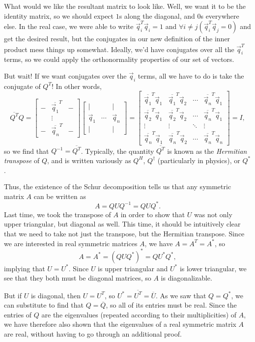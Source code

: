 \documentclass[letterpaper]{article}
\theoremstyle{remark}
\newcommand{\mat}[1]{\ensuremath{\begin{bmatrix}#1\end{bmatrix}}}
\begin{document}
What would we like the resultant matrix to look like. Well, we want it to be the identity matrix, so we should expect $1$s along the diagonal, and $0$s everywhere else. In the real case, we were able to write $\vec{q}_i^T\vec{q}_i = 1$ and $\forall i \ne j(\vec{q}_i^T\vec{q}_j = 0)$ and get the desired result, but the conjugates in our new definition of the inner product mess things up somewhat. Ideally, we'd have conjugates over all the $\vec{q}_i^T$ terms, so we could apply the orthonormality properties of our set of vectors.

But wait! If we want conjugates over the $\vec{q}_i$ terms, all we have to do is take the conjugate of $Q^T$! In other words,
\[
    \overline{Q^T}Q = \mat{ - & \overline{\vec{q}_1}^T & - \\ & \vdots & \\ - & \overline{\vec{q}_n}^T & -}\mat{| & & | \\ \vec{q}_1 & \cdots & \vec{q}_n \\ | & & |} = \mat{
    \overline{\vec{q}_1}^T\vec{q}_1 & \overline{\vec{q}_1}^T\vec{q}_2 & \cdots & \overline{\vec{q}_n}^T\vec{q}_1 \\ 
    \overline{\vec{q}_2}^T\vec{q}_1 & \overline{\vec{q}_2}^T\vec{q}_2 & \cdots & \overline{\vec{q}_n}^T\vec{q}_1 \\
    \vdots & \vdots & \ddots & \vdots \\
    \overline{\vec{q}_n}^T\vec{q}_1 & \overline{\vec{q}_n}^T\vec{q}_2 & \cdots & \overline{\vec{q}_n}^T\vec{q}_n
    } = I,
\]
so we find that $Q^{-1} = \overline{Q^T}$. Typically, the quantity $\overline{Q^T}$ is known as the \emph{Hermitian transpose} of $Q$, and is written variously as $Q^H$, $Q^\dagger$ (particularly in physics), or $Q^*$.

Thus, the existence of the Schur decomposition tells us that any symmetric matrix $A$ can be written as
\[
    A = QUQ^{-1} = QUQ^*.
\]
Last time, we took the transpose of $A$ in order to show that $U$ was not only upper triangular, but diagonal as well. This time, it should be intuitively clear that we need to take not just the transpose, but the Hermitian transpose. Since we are interested in real symmetric matrices $A$, we have $A = A^T = A^*$, so
\[
    A = A^* = (QUQ^*)^* = QU^*Q^*,
\]
implying that $U = U^*$. Since $U$ is upper triangular and $U^*$ is lower triangular, we see that they both must be diagonal matrices, so $A$ is diagonalizable.

But if $U$ is diagonal, then $U = U^T$, so $U^* = \overline{U^T} = \overline{U}$. As we saw that $Q = Q^*$, we can substitute to find that $Q = \overline{Q}$, so all of its entries must be real. Since the entries of $Q$ are the eigenvalues (repeated according to their multiplicities) of $A$, we have therefore also shown that the eigenvalues of a real symmetric matrix $A$ are real, without having to go through an additional proof.
\end{document}
